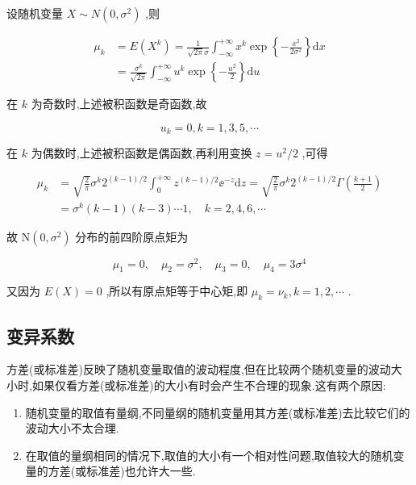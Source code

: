 \begin{example}
	设随机变量 $ X \sim N\left(0, \sigma^{2}\right) $ ,则
	
	\[
	\begin{aligned} 
	\mu_{k} &=E\left(X^{k}\right)=\frac{1}{\sqrt{2 \pi} \sigma} \int_{-\infty}^{+\infty} x^{k} \exp \left\{-\frac{x^{2}}{2 \sigma^{2}}\right\} \mathrm{d} x \\ 
	&=\frac{\sigma^{k}}{\sqrt{2 \pi}} \int_{-\infty}^{+\infty} u^{k} \exp \left\{-\frac{u^{2}}{2}\right\} \mathrm{d} u 
	\end{aligned}
	\]
	
	在 $ k $ 为奇数时,上述被积函数是奇函数,故
	
	\[
	u_{k}=0, k=1,3,5, \cdots
	\]
	
	在 $ k $ 为偶数时,上述被积函数是偶函数,再利用变换 $ z=u^{2} / 2 $ ,可得
	
	\[
	\begin{aligned} \mu_{k} &=\sqrt{\frac{2}{\pi}} \sigma^{k} 2^{(k-1) / 2} \int_{0}^{+\infty} z^{(k-1) / 2} \ee ^{-z} \mathrm{d} z=\sqrt{\frac{2}{\pi}} \sigma^{k} 2^{(k-1) / 2} \Gamma\left(\frac{k+1}{2}\right) \\ &=\sigma^{k}(k-1)(k-3) \cdots 1, \quad k=2,4,6, \cdots \end{aligned}
	\]
	
	故 $ \mathrm{N}\left(0, \sigma^{2}\right) $ 分布的前四阶原点矩为
	
	\[
	\mu_{1}=0, \quad \mu_{2}=\sigma^{2}, \quad \mu_{3}=0, \quad \mu_{4}=3 \sigma^{4}
	\]
	
	又因为 $ E(X)=0 $ ,所以有原点矩等于中心矩,即 $ \mu_{k}=\nu_{k}, k=1,2, \cdots $ .
\end{example}

\subsection{变异系数}

方差(或标准差)反映了随机变量取值的波动程度,但在比较两个随机变量的波动大小时,如果仅看方差(或标准差)的大小有时会产生不合理的现象.这有两个原因:

\begin{enumerate}
	\item 随机变量的取值有量纲,不同量纲的随机变量用其方差(或标准差)去比较它们的波动大小不太合理.
	\item 在取值的量纲相同的情况下,取值的大小有一个相对性问题,取值较大的随机变量的方差(或标准差)也允许大一些.
\end{enumerate}

